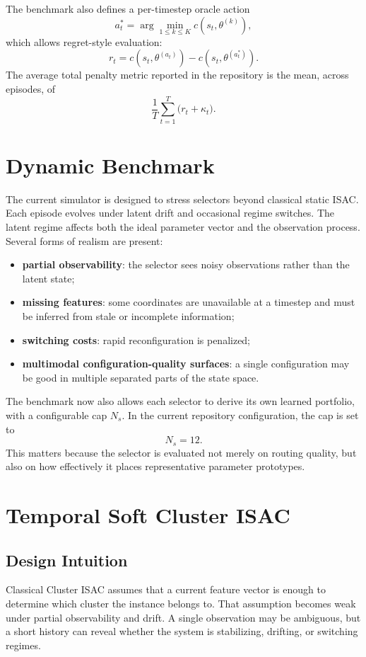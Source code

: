 \documentclass[conference]{IEEEtran}
\begin{document}
The benchmark also defines a per-timestep oracle action
\[
a_t^* = \arg\min_{1 \le k \le K} c(s_t, \theta^{(k)}),
\]
which allows regret-style evaluation:
\[
r_t = c(s_t, \theta^{(a_t)}) - c(s_t, \theta^{(a_t^*)}).
\]
The average total penalty metric reported in the repository is the mean, across episodes, of
\[
\frac{1}{T} \sum_{t=1}^T \bigl(r_t + \kappa_t\bigr).
\]

\section{Dynamic Benchmark}

The current simulator is designed to stress selectors beyond classical static ISAC. Each episode evolves under latent drift and occasional regime switches. The latent regime affects both the ideal parameter vector and the observation process. Several forms of realism are present:
\begin{itemize}
\item \textbf{partial observability}: the selector sees noisy observations rather than the latent state;
\item \textbf{missing features}: some coordinates are unavailable at a timestep and must be inferred from stale or incomplete information;
\item \textbf{switching costs}: rapid reconfiguration is penalized;
\item \textbf{multimodal configuration-quality surfaces}: a single configuration may be good in multiple separated parts of the state space.
\end{itemize}

The benchmark now also allows each selector to derive its own learned portfolio, with a configurable cap $N_s$. In the current repository configuration, the cap is set to
\[
N_s = 12.
\]
This matters because the selector is evaluated not merely on routing quality, but also on how effectively it places representative parameter prototypes.

\section{Temporal Soft Cluster ISAC}

\subsection{Design Intuition}

Classical Cluster ISAC assumes that a current feature vector is enough to determine which cluster the instance belongs to. That assumption becomes weak under partial observability and drift. A single observation may be ambiguous, but a short history can reveal whether the system is stabilizing, drifting, or switching regimes.
\end{document}
